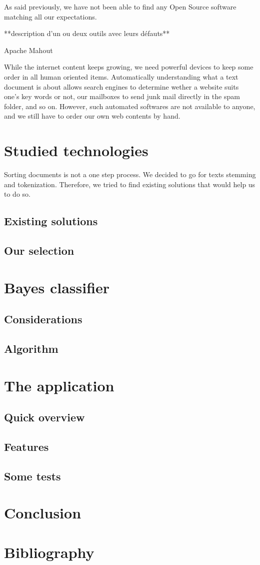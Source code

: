 \documentclass[a4paper,11pt]{article}
\begin{document}
As said previously, we have not been able to find any Open Source software matching all our expectations.

	**description d'un ou deux outils avec leurs défauts**
    
Apache Mahout

While the internet content keeps growing, we need powerful devices to keep some order in all human oriented items. Automatically understanding what a text document is about allows search engines to determine wether a website suits one's key words or not, our mailboxes to send junk mail directly in the spam folder, and so on. However, such automated softwares are not available to anyone, and we still have to order our own web contents by hand.


\section{Studied technologies}

Sorting documents is not a one step process. We decided to go for texts stemming and tokenization. Therefore, we tried to find existing solutions that would help us to do so.

\subsection{Existing solutions}
\subsection{Our selection}


\section{Bayes classifier}
\subsection{Considerations}
\subsection{Algorithm}


\section{The application}
\subsection{Quick overview}
\subsection{Features}
\subsection{Some tests}
    


\section*{Conclusion}


\clearpage
\section*{Bibliography}
\end{document}
